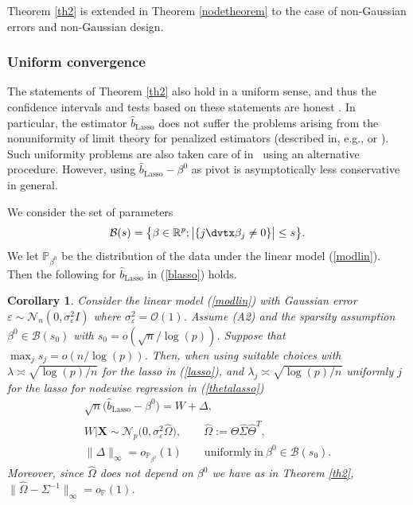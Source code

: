 \documentclass[aos,MSNbibl,dvips]{arximspdf}
\def\cal{\mathcal}
\newtheorem{corr}{Corollary}[section]
\newcommand{\PP}{\mathbb{P}}
\newcommand{\R}{\mathbb{R}}
\newcommand{\eps}{\varepsilon}
\newcommand{\bx}{\mathbf{X}}
\begin{document}

Theorem \ref{th2} is extended in Theorem \ref{nodetheorem} to the case
of non-Gaussian errors and non-Gaussian
design.

\subsubsection{Uniform convergence}\label{uniformsection}

The statements of Theorem \ref{th2} also hold in a uniform sense, and thus
the confidence intervals and tests based on these statements
are honest \cite{li89}. In particular, the estimator $\hat b_\mathrm{Lasso}$
does not suffer the problems arising from the nonuniformity of limit
theory for penalized estimators
(described in, e.g., \cite{potscher2009confidence} or \cite
{potscher2009adistribution}).
Such uniformity problems are also taken care of in~\cite
{berk2013valid} using an alternative procedure.
However, using $\hat b_\mathrm{Lasso}- \beta^0$ as pivot is
asymptotically less
conservative in general.

We consider the set of parameters
%
\[
{\cal B}(s) = \bigl\{\beta\in\R^p; \bigl| \{ j \dvtx \beta_j
\neq0 \} \bigr| \le s\bigr\}.
\]
%
We let $\PP_{\beta^0}$ be the distribution of the data under the linear
model (\ref{modlin}).
Then the following for $\hat{b}_{\mathrm{Lasso}}$ in (\ref{blasso}) holds.
%
\begin{corr}\label{cor1}
Consider the linear model (\ref{modlin}) with Gaussian error $\eps
\sim
{\cal N}_n(0,\sigma_{\eps}^2 I)$ where $\sigma_{\varepsilon}^2 =
{\mathcal
O} (1)$. Assume \textup{(A2)} and the sparsity
assumption $\beta^0 \in{\cal B} (s_0)$ with $s_{0} = o(\sqrt n / \log(p))$.
Suppose that $\max_j s_{j}
= o(n/\log(p))$. Then, when using suitable choices with $\lambda
\asymp
\sqrt{\log(p)/n}$ for the lasso in (\ref{lasso}), and $\lambda_j
\asymp\sqrt{\log(p)/n}$ uniformly $j$ for the lasso for nodewise
regression in (\ref{thetalasso})
%
\begin{eqnarray*}
& \sqrt{n}\bigl(\hat{b}_{\mathrm{Lasso}} - \beta^0\bigr) = W +
\Delta,&
\\
& W|\bx\sim{\cal N}_{p}\bigl(0,\sigma^2_{\eps}
\hat\Omega\bigr),\qquad \hat \Omega:= \hat\Theta\hat\Sigma\hat\Theta^T,&
\\
& \| \Delta\|_{\infty} =o_{\PP_{\beta^0} } (1) \qquad\mathrm{uniformly\ in\ }
\beta^0 \in{\cal B} (s_0).&
\end{eqnarray*}
%
Moreover, since $\hat\Omega$ does not depend
on $\beta^0$ we have as in Theorem
\ref{th2}, $\|\hat\Omega- \Sigma^{-1}\|_{\infty} = o_{\PP}(1)$.
\end{corr}
\end{document}

